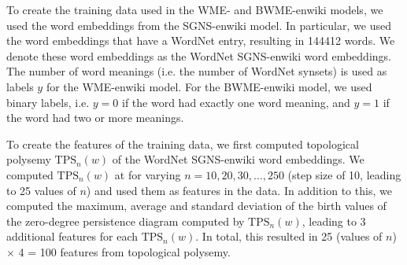 To create the training data used in the WME- and BWME-enwiki models, we used the word embeddings from the SGNS-enwiki model. In particular, we used the word embeddings that have a WordNet entry, resulting in 144412 words. We denote these word embeddings as the WordNet SGNS-enwiki word embeddings. The number of word meanings (i.e. the number of WordNet synsets) is used as labels $y$ for the WME-enwiki model. For the BWME-enwiki model, we used binary labels, i.e. $y=0$ if the word had exactly one word meaning, and $y=1$ if the word had two or more meanings.

To create the features of the training data, we first computed topological polysemy $\text{TPS}_n(w)$ of the WordNet SGNS-enwiki word embeddings. We computed $\text{TPS}_n(w)$ at for varying $n=10, 20, 30, \ldots, 250$ (step size of 10, leading to 25 values of $n$) and used them as features in the data. In addition to this, we computed the maximum, average and standard deviation of the birth values of the zero-degree persistence diagram computed by $\text{TPS}_n(w)$, leading to 3 additional features for each $\text{TPS}_n(w)$. In total, this resulted in 25 (values of $n$) $\times$ 4 = 100 features from topological polysemy.

